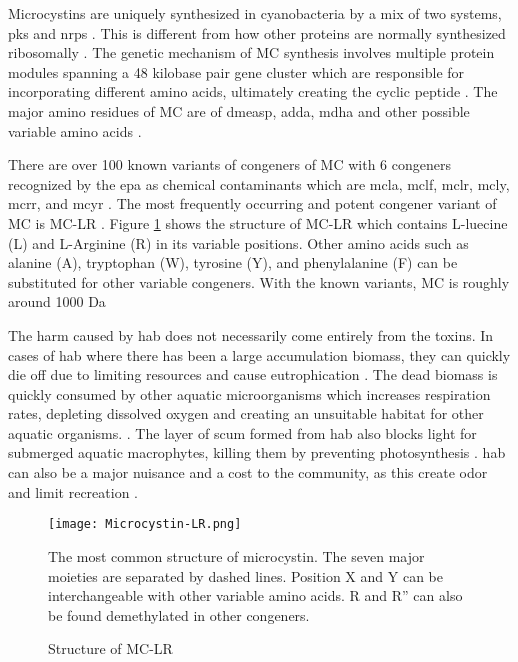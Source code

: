 Microcystins are uniquely synthesized in cyanobacteria by a mix of two systems, \gls{pks} and  \gls{nrps} \cite{tillett_structural_2000}. This is different from how other proteins are normally synthesized ribosomally . The genetic mechanism of MC synthesis involves multiple protein modules spanning a 48 kilobase pair gene cluster which are responsible for incorporating different amino acids, ultimately creating the cyclic peptide \cite{moffitt_characterization_2004,nishizawa_genetic_1999}. The major amino residues of MC  are of \gls{dmeasp}, \gls{adda},  \gls{mdha} and other possible variable amino acids \cite{trogen_conformational_1996,nishizawa_genetic_1999}.

There are over 100 known variants of congeners of MC with 6 congeners recognized by the \gls{epa} as chemical contaminants which are \gls{mcla}, \gls{mclf}, \gls{mclr}, \gls{mcly}, \gls{mcrr}, and \gls{mcyr} \cite{puddick_modulation_2016}. The most frequently occurring and potent congener variant of MC is MC-LR \cite{rastogi_cyanotoxin-microcystins:_2014}. Figure \ref{fig:structure1} shows the structure of MC-LR which contains L-luecine (L) and L-Arginine (R) in its variable positions. Other amino acids such as alanine (A), tryptophan (W), tyrosine (Y), and phenylalanine (F) can be substituted for other variable congeners. With the known variants, MC is roughly around 1000 Da \cite{dittmann_cyanobacterial_2012}

The harm caused by \gls{hab} does not necessarily come entirely from the toxins. In cases of \gls{hab} where there has been a large accumulation biomass, they can quickly die off due to limiting resources and cause eutrophication \cite{charlton_oxygen_1980}. The dead biomass is quickly consumed by other aquatic microorganisms which increases respiration rates, depleting dissolved oxygen and creating an unsuitable habitat for other aquatic organisms.  \cite{anderson_harmful_2002}. The layer of scum formed from \gls{hab} also blocks light for submerged aquatic macrophytes, killing them by preventing photosynthesis \cite{ bucak_modeling_2018}. \gls{hab} can also be a major nuisance and a cost to the community, as this create odor and limit recreation \cite{graham_cyanotoxin_2010, carmichael_health_2016}.



\begin{figure}[!h]
   \texttt{[image: Microcystin-LR.png]}
   \caption{Structure of MC-LR}
   \label{fig:structure1}
   \begin{flushleft}
   The most common structure of microcystin. The seven major moieties are separated by dashed lines. Position X and Y can be interchangeable with other variable amino acids. R and R'' can also be found demethylated in other congeners. 
     \end{flushleft}
 \end{figure}


